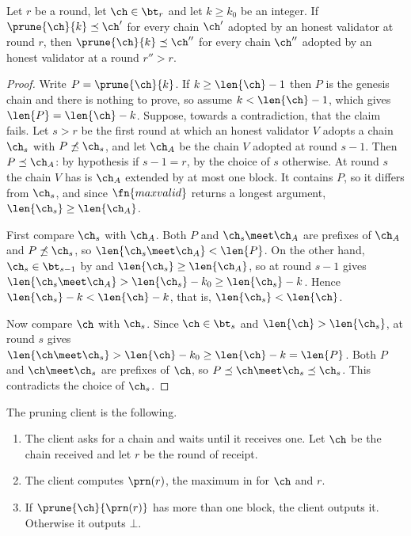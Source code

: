 \begin{lemma}\label{lem.persist}
    Let $r$ be a round, let $\ch\in\bt_r$ and let $k\ge k_0$ be an integer. If
    $\prune{\ch}{k}\preceq\ch'$ for every chain $\ch'$ adopted by an honest
    validator at round $r$, then $\prune{\ch}{k}\preceq\ch''$ for every chain
    $\ch''$ adopted by an honest validator at a round $r''>r$.
\end{lemma}
\begin{proof}
    Write $P=\prune{\ch}{k}$. If $k\ge\len{\ch}-1$ then $P$ is the genesis
    chain and there is nothing to prove, so assume $k<\len{\ch}-1$, which gives
    $\len{P}=\len{\ch}-k$. Suppose, towards a contradiction, that the claim
    fails. Let $s>r$ be the first
    round at which an honest validator $V$ adopts a chain $\ch_s$ with
    $P\not\preceq\ch_s$, and let $\ch_A$ be the chain $V$ adopted at round
    $s-1$. Then $P\preceq\ch_A$: by hypothesis if $s-1=r$, by the choice of $s$
    otherwise. At round $s$ the chain $V$ has is $\ch_A$ extended by at most
    one block. It contains $P$, so it differs from $\ch_s$, and since
    $\fn{maxvalid}$ returns a longest argument, $\len{\ch_s}\ge\len{\ch_A}$.

    First compare $\ch_s$ with $\ch_A$. Both $P$ and $\ch_s\meet\ch_A$ are
    prefixes of $\ch_A$ and $P\not\preceq\ch_s$, so
    $\len{\ch_s\meet\ch_A}<\len{P}$. On the other hand, $\ch_s\in\bt_{s-1}$ by
     and $\len{\ch_s}\ge\len{\ch_A}$, so 
    at round $s-1$ gives $\len{\ch_s\meet\ch_A}>\len{\ch_s}-k_0\ge\len{\ch_s}-k$.
    Hence $\len{\ch_s}-k<\len{\ch}-k$, that is, $\len{\ch_s}<\len{\ch}$.

    Now compare $\ch$ with $\ch_s$. Since $\ch\in\bt_s$ and
    $\len{\ch}>\len{\ch_s}$,  at round $s$ gives
    $\len{\ch\meet\ch_s}>\len{\ch}-k_0\ge\len{\ch}-k=\len{P}$. Both $P$ and
    $\ch\meet\ch_s$ are prefixes of $\ch$, so
    $P\preceq\ch\meet\ch_s\preceq\ch_s$. This contradicts the choice of
    $\ch_s$.
\end{proof}

\begin{definition}\label{def.client}
    The pruning client is the following.
    \begin{enumerate}
        \item The client asks for a chain and waits until it receives one. Let
            $\ch$ be the chain received and let $r$ be the round of receipt.
        \item The client computes $\prn(r)$, the maximum in 
            for $\ch$ and $r$.
        \item If $\prune{\ch}{\prn(r)}$ has more than one block, the client
            outputs it. Otherwise it outputs $\bot$.
    \end{enumerate}
\end{definition}

